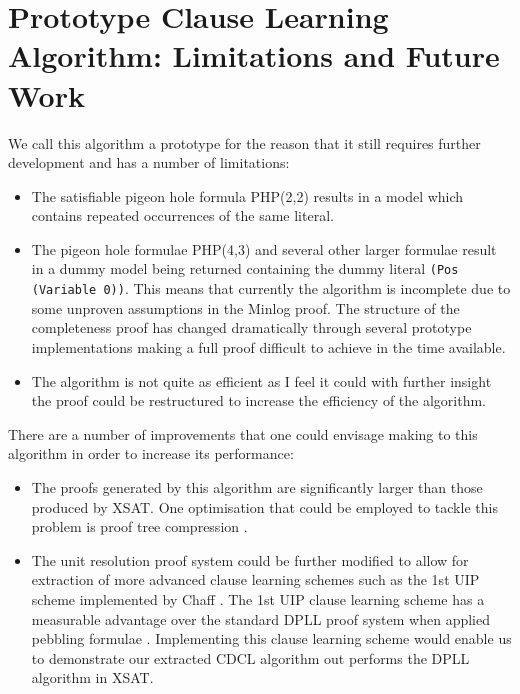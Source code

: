 \section{Prototype Clause Learning Algorithm: Limitations and Future Work}
We call this algorithm a prototype for the reason that it still requires further development and has a number of limitations:

\begin{itemize}
\item The satisfiable pigeon hole formula PHP(2,2) results in a model which contains repeated occurrences of the same literal.

\item The pigeon hole formulae PHP(4,3) and several other larger formulae result in a dummy model being returned containing the dummy literal \texttt{(Pos (Variable 0))}. This means that currently the algorithm is incomplete due to some unproven assumptions in the Minlog proof. The structure of the completeness proof has changed dramatically through several prototype implementations making a full proof difficult to achieve in the time available. 

\item The algorithm is not quite as efficient as I feel it could with further insight the proof could be restructured to increase the efficiency of the algorithm.

\end{itemize}

There are a number of improvements that one could envisage making to this algorithm in order to increase its performance:

\begin{itemize}

\item The proofs generated by this algorithm are significantly larger than those produced by XSAT. One optimisation that could be employed to tackle this problem is proof tree compression \cite{AH07,SR14}.

\item The unit resolution proof system could be further modified to allow for extraction of more advanced clause learning schemes such as the 1st UIP scheme implemented by Chaff \cite{MM01}. The 1st UIP clause learning scheme has a measurable advantage over the standard DPLL proof system when applied pebbling formulae \cite{PB04}. Implementing this clause learning scheme would enable us to demonstrate our extracted CDCL algorithm out performs the DPLL algorithm in XSAT.


\end{itemize}






